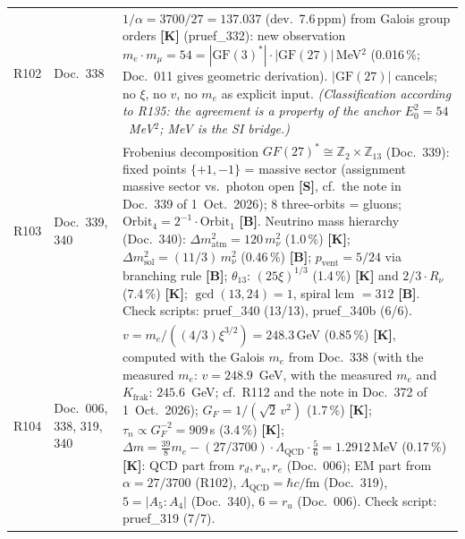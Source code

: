 \begin{longtable}{@{}p{0.9cm}p{3.1cm}p{10.2cm}@{}}
R102 & Doc.~338 & $1/\alpha = 3700/27 = 137.037$ (dev.\ 7.6\,ppm) from Galois group orders \textbf{[K]} (pruef\_332): new observation $m_e\cdot m_\mu = 54 = |\text{GF}(3)^*|\cdot|\text{GF}(27)|$\,MeV$^2$ (0.016\,\%; Doc.~011 gives geometric derivation). $|\text{GF}(27)|$ cancels; no $\xi$, no $v$, no $m_e$ as explicit input. \emph{(Classification according to R135: the agreement is a property of the anchor $E_0^2=54$~MeV$^2$; MeV is the SI bridge.)} \\
R103 & Doc.~339, 340 & Frobenius decomposition $GF(27)^*\cong\mathbb{Z}_2\times\mathbb{Z}_{13}$ (Doc.~339): fixed points $\{+1,-1\}$ = massive sector (assignment massive sector vs.\ photon open \textbf{[S]}, cf.\ the note in Doc.~339 of 1~Oct.~2026); 8 three-orbits = gluons; $\text{Orbit}_4 = 2^{-1}\cdot\text{Orbit}_1$ \textbf{[B]}. Neutrino mass hierarchy (Doc.~340): $\Delta m^2_\text{atm}=120\,m_\nu^2$ (1.0\,\%) \textbf{[K]}; $\Delta m^2_\text{sol}=(11/3)\,m_\nu^2$ (0.46\,\%) \textbf{[B]}; $p_\text{vent}=5/24$ via branching rule \textbf{[B]}; $\theta_{13}$: $(25\xi)^{1/3}$ (1.4\,\%) \textbf{[K]} and $2/3\cdot R_\nu$ (7.4\,\%) \textbf{[K]}; $\gcd(13,24)=1$, spiral lcm $=312$ \textbf{[B]}. Check scripts: pruef\_340 (13/13), pruef\_340b (6/6). \\
R104 & Doc.~006, 338, 319, 340 & $v=m_e/((4/3)\xi^{3/2})=248.3$\,GeV (0.85\,\%) \textbf{[K]}, computed with the Galois $m_e$ from Doc.~338 (with the measured $m_e$: $v=248.9$~GeV, with the measured $m_e$ and $K_{\mathrm{frak}}$: $245.6$~GeV; cf.\ R112 and the note in Doc.~372 of 1~Oct.~2026); $G_F=1/(\sqrt{2}\,v^2)$ (1.7\,\%) \textbf{[K]}; $\tau_n\propto G_F^{-2}=909$\,s (3.4\,\%) \textbf{[K]}; $\Delta m=\frac{39}{8}m_e-(27/3700)\cdot\Lambda_\text{QCD}\cdot\frac{5}{6}=1.2912$\,MeV (0.17\,\%) \textbf{[K]}: QCD part from $r_d,r_u,r_e$ (Doc.~006); EM part from $\alpha=27/3700$ (R102), $\Lambda_\text{QCD}=\hbar c/\mathrm{fm}$ (Doc.~319), $5=|A_5:A_4|$ (Doc.~340), $6=r_u$ (Doc.~006). Check script: pruef\_319 (7/7). \\

\end{longtable}
